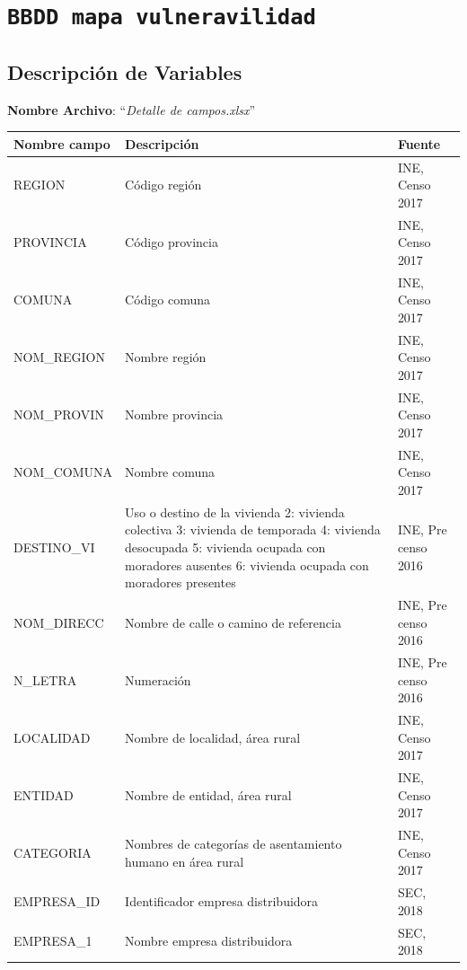 \documentclass[
]{book}
\begin{document}
\hypertarget{bbdd-mapa-vulneravilidad}{%
\section{\texorpdfstring{\texttt{BBDD\ mapa\ vulneravilidad}}{BBDD mapa vulneravilidad}}\label{bbdd-mapa-vulneravilidad}}

\hypertarget{descripciuxf3n-de-variables}{%
\subsection{Descripción de Variables}\label{descripciuxf3n-de-variables}}

\textbf{Nombre Archivo}: ``\emph{Detalle de campos.xlsx}''

\begingroup\fontsize{11}{13}\selectfont

\begin{tabu} to 
\hline
Nombre campo & Descripción & Fuente\\
\hline
REGION & Código región & INE, Censo 2017\\
\hline
PROVINCIA & Código provincia & INE, Censo 2017\\
\hline
COMUNA & Código comuna & INE, Censo 2017\\
\hline
NOM\_REGION & Nombre región & INE, Censo 2017\\
\hline
NOM\_PROVIN & Nombre provincia & INE, Censo 2017\\
\hline
NOM\_COMUNA & Nombre comuna & INE, Censo 2017\\
\hline
DESTINO\_VI & Uso o destino de la vivienda 
2: vivienda colectiva
3: vivienda de temporada
4: vivienda desocupada
5: vivienda ocupada con moradores ausentes
6: vivienda ocupada con moradores presentes & INE, Pre censo 2016\\
\hline
NOM\_DIRECC & Nombre de calle o camino de referencia & INE, Pre censo 2016\\
\hline
N\_LETRA & Numeración & INE, Pre censo 2016\\
\hline
LOCALIDAD & Nombre de localidad, área rural & INE, Censo 2017\\
\hline
ENTIDAD & Nombre de entidad, área rural & INE, Censo 2017\\
\hline
CATEGORIA & Nombres de categorías de asentamiento humano en área rural & INE, Censo 2017\\
\hline
EMPRESA\_ID & Identificador empresa distribuidora & SEC, 2018\\
\hline
EMPRESA\_1 & Nombre empresa distribuidora & SEC, 2018\\

\end{tabu}
\end{document}
